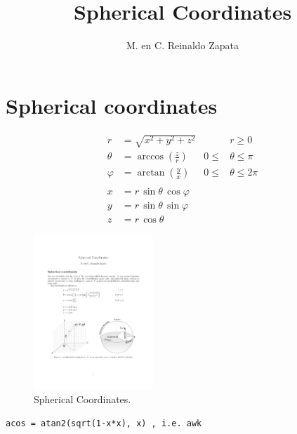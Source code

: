 \documentclass{article}
\title{Spherical Coordinates}
\author{M. en C. Reinaldo Zapata}
\begin{document}
\maketitle

\section*{Spherical coordinates} %
\label{sec:spherical_coordinates}

\begin{align*}
r &= \sqrt{x^{2} + y^{2} + z^{2}} & & r \geq 0\\
\theta &= \arccos \left( \frac{z}{r} \right) & 0 \leq &\theta \leq \pi \\
\varphi &= \arctan \left( \frac{y}{x} \right) & 0 \leq &\theta \leq 2\pi \\ \\ 
x &= r \, \sin \theta \, \cos \varphi \\
y &= r \, \sin \theta \, \sin \varphi \\
z &= r \, \cos \theta
\end{align*}

\begin{figure}[h]
    \centering
    \includegraphics[width=0.4\textwidth]{spherical_coordinates}
    \caption{Spherical Coordinates.}
    \label{fig:spherical coordinates}
\end{figure}

\tt{acos =  atan2(sqrt(1-x*x), x) }, i.e.
awk 


\end{document}
